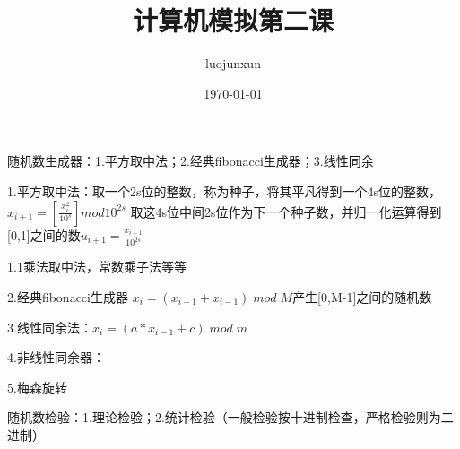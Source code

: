 \documentclass[12pt, a4paper, oneside]{ctexart}
\title{\huge\textbf{计算机模拟第二课}}
\author{luojunxun}
\date{\today}
\begin{document}
\maketitle
随机数生成器：1.平方取中法；2.经典fibonacci生成器；3.线性同余

1.平方取中法：取一个2s位的整数，称为种子，将其平凡得到一个4s位的整数，$x_{i+1}=[\frac{x_i^2}{10^s}]mod10^{2s}$
取这4s位中间2s位作为下一个种子数，并归一化运算得到[0,1]之间的数$u_{i+1}=\frac{x_{i+1}}{10^{2s}}$

1.1乘法取中法，常数乘子法等等

2.经典fibonacci生成器 $x_i=(x_{i-1}+x_{i-1})\;mod\; M$产生[0,M-1]之间的随机数

3.线性同余法：$x_i=(a*x_{i-1}+c)\;mod\;m$

4.非线性同余器：

5.梅森旋转


随机数检验：1.理论检验；2.统计检验（一般检验按十进制检查，严格检验则为二进制）

























% 
% 
\end{document}
